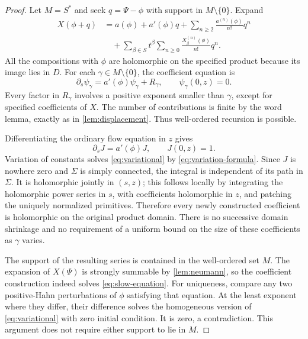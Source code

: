 \documentclass[11pt,a4paper]{article}
\numberwithin{equation}{section}
\theoremstyle{definition}
\theoremstyle{remark}
\begin{document}
\begin{proof}
Let $M=S^*$ and seek $q=\Psi-\phi$ with support in
$M\setminus\{0\}$.  Expand
\begin{align*}
 X(\phi+q)
 &=a(\phi)+a'(\phi)q+
      \sum_{n\geq2}\frac{a^{(n)}(\phi)}{n!}q^n\\
 &\quad+\sum_{\beta\in S}t^\beta
            \sum_{n\geq0}\frac{X_\beta^{(n)}(\phi)}{n!}q^n.
\end{align*}
All the compositions with $\phi$ are holomorphic on the specified product
because its image lies in $D$.  For each $\gamma\in M\setminus\{0\}$,
the coefficient equation is
\begin{equation}\label{eq:variational}
 \partial_s\psi_\gamma=a'(\phi)\psi_\gamma+R_\gamma,
 \qquad\psi_\gamma(0,z)=0.
\end{equation}
Every factor in $R_\gamma$ involves a positive exponent smaller than
$\gamma$, except for specified coefficients of $X$.  The number of
contributions is finite by the word lemma, exactly as in
\cref{lem:displacement}.  Thus well-ordered recursion is possible.

Differentiating the ordinary flow equation in $z$ gives
\[
 \partial_s J=a'(\phi)J,\qquad J(0,z)=1.
\]
Variation of constants solves \eqref{eq:variational} by
\eqref{eq:variation-formula}.  Since $J$ is nowhere zero and $\Sigma$ is
simply connected, the integral is independent of its path in $\Sigma$.
It is holomorphic jointly in $(s,z)$; this follows locally by integrating
the holomorphic power series in $s$, with coefficients holomorphic in $z$,
and patching the uniquely normalized primitives.  Therefore every newly
constructed coefficient is holomorphic on the original product domain.
There is no successive domain shrinkage and no requirement of a uniform
bound on the size of these coefficients as $\gamma$ varies.

The support of the resulting series is contained in the well-ordered set
$M$.  The expansion of $X(\Psi)$ is strongly summable by
\cref{lem:neumann}, so the coefficient construction indeed solves
\eqref{eq:slow-equation}.  For uniqueness, compare any two positive-Hahn
perturbations of $\phi$ satisfying that equation.  At the least exponent
where they differ, their difference solves the homogeneous version of
\eqref{eq:variational} with zero initial condition.  It is zero, a
contradiction.  This argument does not require either support to lie in
$M$.


\end{proof}
\end{document}

